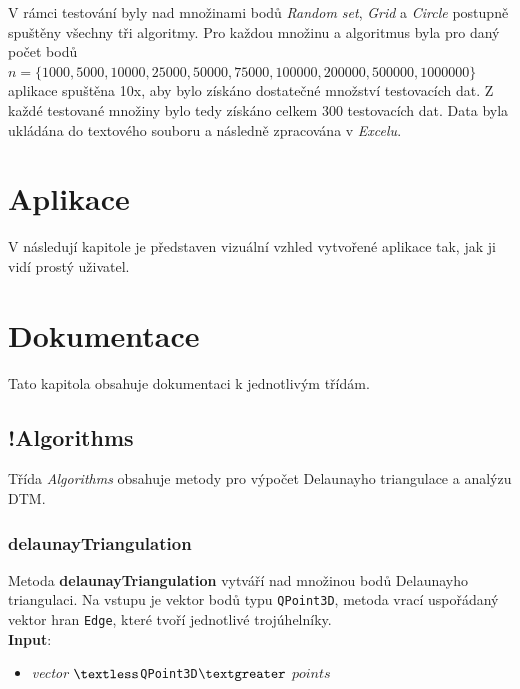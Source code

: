 \documentclass[a4paper, 12pt]{article}
\begin{document}
V rámci testování byly nad množinami bodů \textit{Random set}, \textit{Grid} a \textit{Circle} postupně spuštěny všechny tři algoritmy. Pro každou množinu a algoritmus byla pro daný počet bodů $n = \{1000, 5000, 10000, 25000, 50000, 75000, 100000, 200000, 500000, 1000000\}$ aplikace spuš\-tě\-na 10x, aby bylo získáno dostatečné množství testovacích dat. Z každé testované množiny bylo tedy získáno celkem 300 testovacích dat. Data byla ukládána do textového souboru a následně zpracována v \textit{Excelu}.


\clearpage
\section{Aplikace}
V následují kapitole je představen vizuální vzhled vytvořené aplikace tak, jak ji vidí prostý uživatel.




\clearpage
 
\section{Dokumentace}
Tato kapitola obsahuje dokumentaci k jednotlivým třídám.

\subsection{!Algorithms}
Třída \textit{Algorithms} obsahuje metody pro výpočet Delaunayho triangulace a analýzu DTM.

\subsubsection*{delaunayTriangulation}
Metoda \textbf{delaunayTriangulation} vytváří nad množinou bodů Delaunayho triangulaci. Na vstupu je vektor bodů typu \texttt{QPoint3D}, metoda vrací uspořádaný vektor hran \texttt{Edge}, které tvoří jednotlivé trojúhelníky.\\

\textbf{Input}:
\begin{itemize}
\item \textsl{vector} $\textless$\texttt{QPoint3D}$\textgreater$ $points$
\end{itemize}
\end{document}
